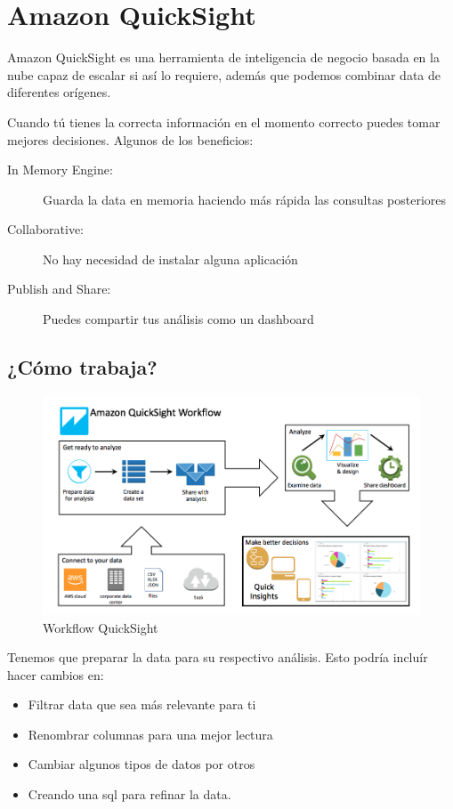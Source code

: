 \section{Amazon QuickSight}

Amazon QuickSight \cite{aws-quicksight} es una herramienta de inteligencia de negocio
basada en la nube capaz de escalar si así lo requiere, además que podemos combinar data de diferentes
orígenes.

Cuando tú tienes la correcta información en el momento correcto puedes tomar mejores decisiones.
Algunos de los beneficios: \
\begin{description}
	\item[In Memory Engine:] Guarda la data en memoria haciendo más rápida las consultas posteriores
	\item[Collaborative:] No hay necesidad de instalar alguna aplicación
	\item[Publish and Share:] Puedes compartir tus análisis como un dashboard
\end{description}

\subsection{¿Cómo trabaja?}
\begin{figure}[h!]
	\centering
	\includegraphics[width=\columnwidth]{images/aws_quicksight}
	\caption{Workflow QuickSight}
	\label{fig:quicksight_workflow}
\end{figure}

Tenemos que preparar la data para su respectivo análisis. Esto podría incluír hacer cambios en: \
\begin{itemize}
	\item Filtrar data que sea más relevante para ti
	\item Renombrar columnas para una mejor lectura
	\item Cambiar algunos tipos de datos por otros
	\item Creando una sql para refinar la data.
\end{itemize}

